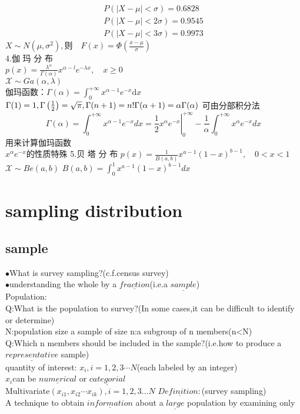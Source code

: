 \documentclass[cn,11pt,chinese,black]{elegantbook}
\begin{document}
$$
\begin{array}{l}{P(|X-\mu|<\sigma)=0.6828} \\ {P(|X-\mu|<2 \sigma)=0.9545} \\ {P(|X-\mu|<3 \sigma)=0.9973}\end{array}$$
$X \sim N\left(\mu, \sigma^{2}\right), 则 \quad F(x)=\Phi\left(\frac{x-\mu}{\sigma}\right)$\\
4.伽 玛 分 布\\
$p(x)=\frac{\lambda^{\alpha}}{\Gamma(\alpha)} x^{\alpha-l} e^{-\lambda x}, \quad x \geq 0$\\
$\mathcal{X} \sim G a(\alpha, \lambda)$\\
伽玛函数：$\Gamma(\alpha)=\int_{0}^{+\infty} x^{\alpha-1} e^{-x} \mathrm{d} x$ \\
$\Gamma(1)=1, \Gamma\left(\frac{1}{2}\right)=\sqrt{\pi},\Gamma(n+1)=n ! \\ \Gamma(\alpha+1)=\alpha \Gamma(\alpha)$
可由分部积分法$$\Gamma(\alpha)=\int_{0}^{+\infty} x^{\alpha-1} e^{-x} d x=\left.\frac{1}{2} x^{\alpha} e^{-x}\right|_{0} ^{+\infty}-\frac{1}{\alpha} \int_{0}^{+\infty} x^{\alpha} e^{-x} d x
$$
用来计算伽玛函数
\\$x^{\alpha} e^{-x}$的性质特殊
5.贝 塔 分 布
$p(x)=\frac{1}{B(a, b)} x^{a-1}(1-x)^{b-1}, \quad 0<x<1$
$\mathcal{X} \sim Be(a, b)$
$B(a, b)=\int_{0}^{1} x^{a-1}(1-x)^{b-1} d x$
\chapter{sampling distribution}
\section{sample}
\noindent$\bullet$What is survey sampling?(c.f.census survey)\\
$\bullet$understanding the whole by a $\underline{fraction}$(i.e.a $\underline{sample}$)
\\Population:\\
Q:What is the population to survey?(In some cases,it can be difficult to identify or determine)\\
N:population size
a sample of size n:a subgroup of n members(n<N)\\
Q:Which n members should be included in the sample?(i.e.how to produce a $\underline{representative}$ sample)\\
quantity of interest: 
$x_i,i=1,2,3\cdots N$(each labeled by an integer)\\
$x_i$can be $\underline{numerical}$ or $\underline{categorial}$
\\Multivariate$(x_{i1},x_{i2}\cdots x_{ik}),i=1,2,3 \dots N$
$\underline{Definition : }$(survey sampling)\\
A technique to obtain $\underline{information}$ about a $\underline{large}$ population by examining only
\end{document}
